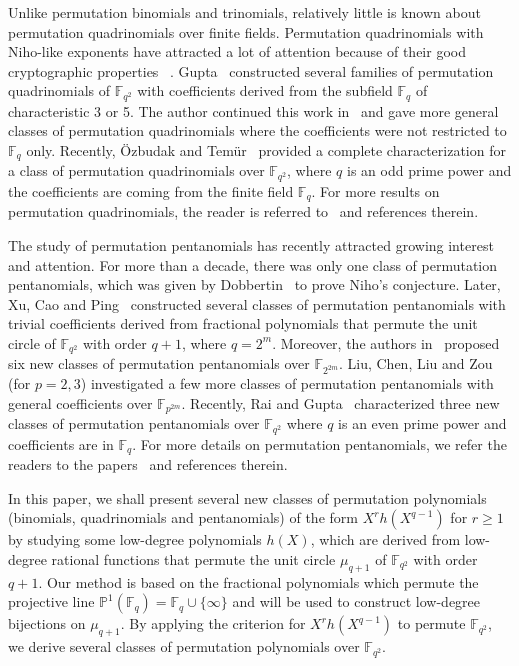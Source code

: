 \documentclass[12pt]{amsart}
\numberwithin{equation}{section}
\theoremstyle{definition}
\newcommand{\F}{\mathbb F}
\newcommand{\bP}{\mathbb P}
\begin{document}
Unlike permutation binomials and trinomials, relatively little is known about permutation quadrinomials over finite fields. Permutation quadrinomials with Niho-like exponents have attracted a lot of attention because of
their good cryptographic properties ~\cite{KLi_quad_2021, NLi_quad_2021}. Gupta~\cite{Gupta20} constructed several families of permutation quadrinomials of $\F_{q^2}$ with coefficients derived from the subfield $\F_q$ of characteristic 3 or 5. The author continued this work in~\cite{Gupta22} and gave more general classes of permutation quadrinomials where the coefficients were not restricted to $\F_q$ only. 
Recently, {\"O}zbudak and Tem{\"u}r~\cite{FB_quad_2023} provided a complete characterization for a class of permutation quadrinomials over $\F_{q^2}$, where $q$ is an odd prime power and the coefficients are coming from the finite field $\F_q$. For more results on permutation quadrinomials, the reader is referred to~\cite{ Chen, KLi_quad_2020, NLi_quad_2021,Gupta_resi_2023, ZTu_quad_19,  ZTu_quad_18_2, ZTu_quad_18_1, Zheng_quad_22} and references therein.

The study of permutation pentanomials has recently attracted growing interest and attention. For more than a decade, there was only one class of permutation pentanomials, which was given by Dobbertin~\cite{Dobbertin_niho} to prove Niho’s conjecture. Later, Xu, Cao and Ping~\cite{Xu_penta_18} constructed several classes of permutation pentanomials with trivial coefficients derived from fractional polynomials that permute the unit circle of $\F_{q^2}$ with order $q+1$, where $q=2^m$. 
Moreover, the authors in~\cite{LQW} proposed six new classes of permutation pentanomials over $\F_{2^{2m}}$.
Liu, Chen, Liu and Zou~\cite{QLiu_penta_2023} (for $p=2,3$) investigated a few more classes of permutation pentanomials with general coefficients over $\F_{p^{2m}}$. Recently, Rai and Gupta~\cite{Rai} characterized three new classes of permutation pentanomials over $\F_{q^2}$ where $q$ is an even prime power and coefficients are in $\F_q$.
For more details on permutation pentanomials, we refer the readers to the papers~\cite{Deng, KX, Shen, Zhang_penta_23} and references therein.

In this paper, we shall present several new classes of permutation polynomials (binomials, quadrinomials and pentanomials) of the form $X^rh(X^{q-1})$ for $r\geq 1$ by studying some low-degree polynomials $h(X)$, which are derived from low-degree rational functions that permute the unit circle $\mu_{q+1}$ of $\F_{q^2}$ with order $q+1$. 
Our method is based on the fractional polynomials which permute the projective line $\bP^1(\F_q)= \F_q \cup \{ \infty \}$ and will be used to construct low-degree bijections on $\mu_{q+1}$.
By applying the criterion \cite{Park_2001, Wang_2007, Zieve2008}  for $X^rh(X^{q-1})$ to permute $\F_{q^2}$, we derive several classes of permutation polynomials over $\F_{q^2}$.
\end{document}
